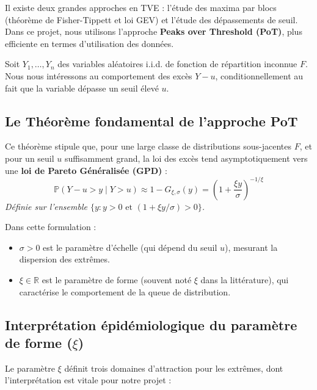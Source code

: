\documentclass[11pt,a4paper]{article}
\begin{document}
Il existe deux grandes approches en TVE : l'étude des maxima par blocs (théorème de Fisher-Tippett et loi GEV) et l'étude des dépassements de seuil. Dans ce projet, nous utilisons l'approche \textbf{Peaks over Threshold (PoT)}, plus efficiente en termes d'utilisation des données.

Soit $Y_1, \dots, Y_n$ des variables aléatoires i.i.d. de fonction de répartition inconnue $F$. Nous nous intéressons au comportement des excès $Y - u$, conditionnellement au fait que la variable dépasse un seuil élevé $u$.

\subsection{Le Théorème fondamental de l'approche PoT}

\begin{tcolorbox}[colback=thmblue, colframe=borderblue, title=\textbf{Théorème de Pickands-Balkema-de Haan (1974)}, rounded corners]
Ce théorème stipule que, pour une large classe de distributions sous-jacentes $F$, et pour un seuil $u$ suffisamment grand, la loi des excès tend asymptotiquement vers une \textbf{loi de Pareto Généralisée (GPD)} :
\begin{equation}
    \mathbb{P}(Y - u > y \mid Y > u) \approx 1 - G_{\xi, \sigma}(y) = \left( 1 + \frac{\xi y}{\sigma} \right)^{-1/\xi}
\end{equation}
\textit{Définie sur l'ensemble $\{y : y > 0 \text{ et } (1 + \xi y / \sigma) > 0\}$.}
\end{tcolorbox}

Dans cette formulation :
\begin{itemize}
    \item \textbf{$\sigma > 0$} est le paramètre d'échelle (qui dépend du seuil $u$), mesurant la dispersion des extrêmes.
    \item \textbf{$\xi \in \mathbb{R}$} est le paramètre de forme (souvent noté $\xi$ dans la littérature), qui caractérise le comportement de la queue de distribution.
\end{itemize}

\subsection{Interprétation épidémiologique du paramètre de forme ($\xi$)}

Le paramètre $\xi$ définit trois domaines d'attraction pour les extrêmes, dont l'interprétation est vitale pour notre projet :
\end{document}
